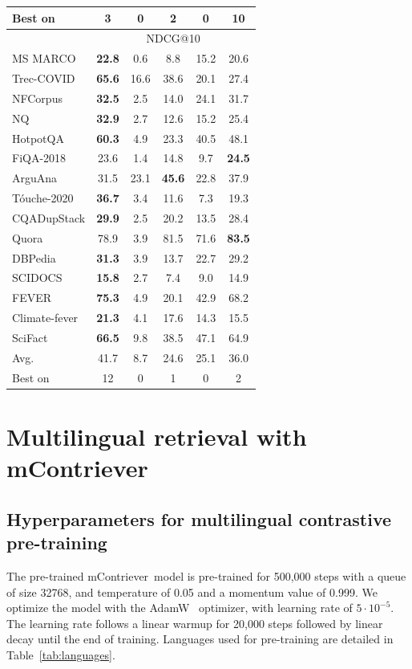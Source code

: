 \documentclass[10pt]{article} %
\def \oursmulti          {mContriever}
\begin{document}
\begin{table}[t!]
\begin{tabular}{@{}l  c  c  c c  >{\columncolor{bluegrey}}c}
  Best on       & 3 & 0 & 2 & 0 & 10 \\
  \midrule
  & \multicolumn{5}{c}{NDCG@10}\\
  \midrule
  MS MARCO      & \bf 22.8 & 0.6 & 8.8 & 15.2 & 20.6\\
  Trec-COVID    & \bf 65.6 & 16.6 & 38.6 & 20.1 & 27.4 \\
  NFCorpus      & \bf 32.5 & 2.5 & 14.0 & 24.1 & 31.7 \\
  NQ            & \bf 32.9 & 2.7 & 12.6 & 15.2 & 25.4 \\
  HotpotQA      & \bf 60.3 & 4.9 & 23.3 & 40.5 & 48.1 \\
  FiQA-2018     & 23.6 & 1.4 & 14.8 & 9.7 & \bf 24.5 \\
  ArguAna       & 31.5 & 23.1 & \bf 45.6 & 22.8 & 37.9 \\
  T\'ouche-2020 & \bf 36.7 & 3.4 & 11.6 & 7.3 & 19.3 \\
  CQADupStack   & \bf 29.9 & 2.5 & 20.2 & 13.5 & 28.4 \\
  Quora         & 78.9 & 3.9 & 81.5 & 71.6 & \bf 83.5 \\
  DBPedia       & \bf 31.3 & 3.9 & 13.7 & 22.7 & 29.2 \\
  SCIDOCS       & \bf 15.8 & 2.7 & 7.4 & 9.0 & 14.9 \\
  FEVER         & \bf 75.3 & 4.9 & 20.1 &  42.9 & 68.2 \\
  Climate-fever & \bf 21.3 & 4.1 & 17.6 & 14.3 & 15.5 \\
  SciFact       & \bf 66.5 & 9.8 & 38.5 & 47.1 & 64.9 \\ \midrule
  Avg. & 41.7 & 8.7 & 24.6 & 25.1 & 36.0 \\
  Best on       & 12 & 0 & 1 & 0 & 2 \\
        \bottomrule
    \end{tabular}%
\end{table}

\section{Multilingual retrieval with \oursmulti}
\label{appendix:multilingual}

\subsection{Hyperparameters for multilingual contrastive pre-training}
\label{appendix:multilingual_pretraining}
The pre-trained \oursmulti~model is pre-trained for 500,000 steps with a queue of size 32768, and temperature of 0.05 and a momentum value of 0.999.
We optimize the model with the AdamW~\citep{loshchilov2019decoupled} optimizer, with learning rate of $5 \cdot 10^{-5}$. 
The learning rate follows a linear warmup for 20,000 steps followed by linear decay until the end of training.
Languages used for pre-training are detailed in Table~\ref{tab:languages}.
\end{document}

